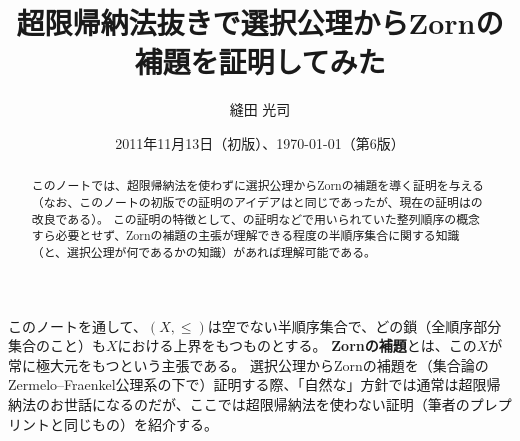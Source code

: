 ﻿\documentclass{ltjsarticle}
\title{超限帰納法抜きで選択公理からZornの補題を証明してみた}
\author{縫田 光司}
\date{2011年11月13日（初版）、\today （第6版）}
\theoremstyle{definition}
\begin{document}
\maketitle
\vspace*{-2em}

\begin{abstract}
    このノートでは、超限帰納法を使わずに選択公理からZornの補題を導く証明を与える（なお、このノートの初版での証明のアイデアは\cite[Theorem 4.19]{RubRub85}と同じであったが、現在の証明は\cite{Lewin91}の改良である）。
    この証明の特徴として、\cite{Lewin91}の証明などで用いられていた整列順序の概念すら必要とせず、Zornの補題の主張が理解できる程度の半順序集合に関する知識（と、選択公理が何であるかの知識）があれば理解可能である。
\end{abstract}

このノートを通して、$(X,\leq)$は空でない半順序集合で、どの鎖（全順序部分集合のこと）も$X$における上界をもつものとする。
\textbf{Zornの補題}とは、この$X$が常に極大元をもつという主張である。
選択公理からZornの補題を（集合論のZermelo--Fraenkel公理系の下で）証明する際、「自然な」方針では通常は超限帰納法のお世話になるのだが、ここでは超限帰納法を使わない証明（筆者のプレプリント\cite{Nuida23}と同じもの）を紹介する。
\end{document}

